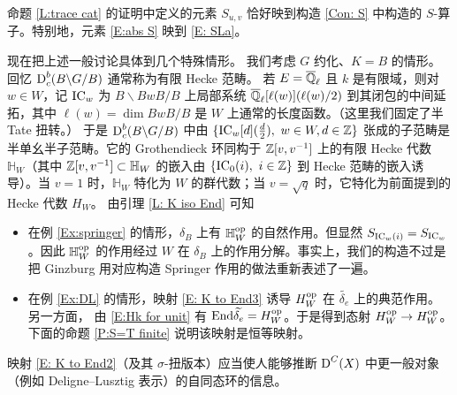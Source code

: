 命题 \ref{L:trace cat} 的证明中定义的元素 $S_{u,v}$ 恰好映到构造 \ref{Con: S} 中构造的 $S$-算子。特别地，元素 \eqref{E:abs S} 映到 \eqref{E: SLa}。

\begin{ex}
现在把上述一般讨论具体到几个特殊情形。
我们考虑 $G$ 约化、$K=B$ 的情形。回忆 $\operatorname{D}_c^b(B\backslash G/B)$ 通常称为有限 Hecke 范畴。
若 $E={\overline{{\mathbb Q}}_\ell}$ 且 $k$ 是有限域，则对 $w\in W$，记 $\operatorname{IC}_w$ 为 $B\backslash BwB/B$ 上局部系统 ${\overline{{\mathbb Q}}_\ell}[\ell(w)](\ell(w)/2)$ 到其闭包的中间延拓，其中 $\ell(w)=\dim BwB/B$ 是 $W$ 上通常的长度函数。（这里我们固定了半 Tate 扭转。）
于是 $\operatorname{D}_c^b(B\backslash G/B)$ 中由 $\{\operatorname{IC}_w[d](\frac{d}{2}),\ w\in W, d\in {\mathbb Z}\}$ 张成的子范畴是半单幺半子范畴。它的 Grothendieck 环同构于 ${\mathbb Z}[v,v^{-1}]$ 上的有限 Hecke 代数 $\mathbb H_W$（其中 ${\mathbb Z}[v,v^{-1}]\subset \mathbb H_W$ 的嵌入由 $\{\operatorname{IC}_0(i), \ i\in{\mathbb Z}\}$ 到 Hecke 范畴的嵌入诱导）。当 $v=1$ 时，$\mathbb H_W$ 特化为 $W$ 的群代数；当 $v=\sqrt{q}$ 时，它特化为前面提到的 Hecke 代数 $H_W$。
由引理 \ref{L: K iso End} 可知
\begin{itemize}
\item 在例 \ref{Ex:springer} 的情形，$\delta_B$ 上有 ${\mathbb H}^{\operatorname{op}}_W$ 的自然作用。但显然 $S_{\operatorname{IC}_w(i)}=S_{\operatorname{IC}_w}$。因此 ${\mathbb H}^{\operatorname{op}}_W$ 的作用经过 $W$ 在 $\delta_B$ 上的作用分解。事实上，我们的构造不过是把 Ginzburg 用对应构造 Springer 作用的做法重新表述了一遍。
\item 在例 \ref{Ex:DL} 的情形，映射 \eqref{E: K to End3} 诱导 $H_W^{\operatorname{op}}$ 在 $\widetilde{\delta_e}$ 上的典范作用。另一方面，
由 \eqref{E:Hk for unit} 有 ${\operatorname{End}}\widetilde{\delta_e}=H_W^{\operatorname{op}}$。于是得到态射 $H^{\operatorname{op}}_W\to H^{\operatorname{op}}_W$。下面的命题 \ref{P:S=T finite} 说明该映射是恒等映射。
\end{itemize}
\end{ex}
\begin{rmk}
映射 \eqref{E: K to End2}（及其 $\sigma$-扭版本）应当使人能够推断 $\operatorname{D}^C(X)$ 中更一般对象（例如 Deligne–Lusztig 表示）的自同态环的信息。
\end{rmk}

